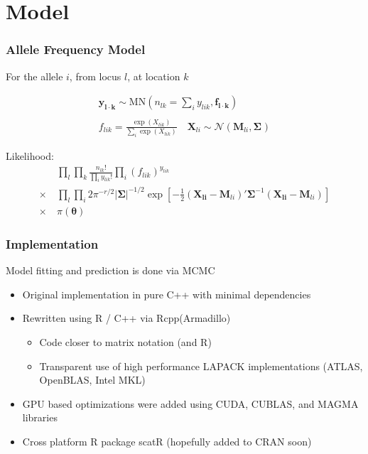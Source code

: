 \documentclass[slidestop,mathserif]{beamer}
\begin{document}
\section{Model}

\begin{frame}
\frametitle{Allele Frequency Model}

For the allele $i$, from locus $l$, at location $k$

\begin{align*}
\bm{y_{l \cdot k}} \sim \text{MN}\left(n_{lk}=\textstyle\sum_i y_{lik}, \bm{f_{l \cdot k}}\right) \\
\\
f_{lik} = \frac{\exp(X_{lik})}{\sum_i \exp(X_{lik})} \quad
\bm{X}_{li} \sim \mathcal{N}( \bm{M}_{li}, \bm{\Sigma_{}})
\end{align*}

\pause

Likelihood:
\begin{align*}
       &~\prod_l \prod_k \frac{n_{lk}!}{\prod_i y_{lik}!} \textstyle\prod_i (f_{lik})^{y_{lik}} \\
\times &~\prod_l \prod_i 2\pi^{-r/2} |\bm\Sigma|^{-1/2} \exp\left[ -\frac{1}{2}(\bm{X_{li}} - \bm{M}_{li})'\bm\Sigma^{-1} (\bm{X_{li}} - \bm{M}_{li}) \right]\\
\times &~\pi(\bm\theta)
\end{align*}

\end{frame}


\begin{frame}
\frametitle{Implementation}

Model fitting and prediction is done via MCMC \\
\begin{itemize} \addtolength{\itemsep}{3mm}
\item Original implementation in pure C++ with minimal dependencies
\item Rewritten using R / C++ via Rcpp(Armadillo) 
\begin{itemize}
\item Code closer to matrix notation (and R)
\item Transparent use of high performance LAPACK implementations (ATLAS, OpenBLAS, Intel MKL)
\end{itemize}
\item GPU based optimizations were added using CUDA, CUBLAS, and MAGMA libraries
\item Cross platform R package scatR (hopefully added to CRAN soon)
\end{itemize}

\end{frame}
\end{document}
